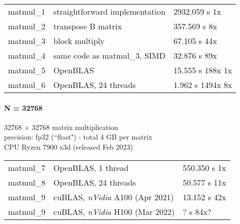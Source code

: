 \documentclass[12pt]{article}
\begin{document}
\begin{tabular}{l l l}
matmul\_1 & straightforward implementation & 2932.059 s \quad 1x \\
matmul\_2 & transpose B matrix & 357.569 s \quad 8x \\
matmul\_3 & block multiply & 67.105 s \quad 44x \\
matmul\_4 & same code as matmul\_3, SIMD & 32.876 s \quad 89x \\
matmul\_5 & OpenBLAS & 15.555 s \quad 188x 1x \\
matmul\_6 & OpenBLAS, 24 threads & 1.962 s \quad 1494x 8x \\
\end{tabular}

\paragraph{N = 32768}
32768 $\times$ 32768 matrix multiplication \\
precision: fp32 (``float") - total 4 GB per matrix \\
CPU Ryzen 7900 x3d (released Feb 2023)

\begin{tabular}{l l l}
matmul\_7 & OpenBLAS, 1 thread & 550.350 s \quad 1x \\
matmul\_8 & OpenBLAS, 24 threads & 50.577 s \quad 11x \\
matmul\_9 & cuBLAS, \textit{nVidia} A100 (Apr 2021) & 13.152 s \quad 42x \\
matmul\_9 & cuBLAS, \textit{nVidia} H100 (Mar 2022) & ? s \quad 84x? \\
\end{tabular}
\end{document}
